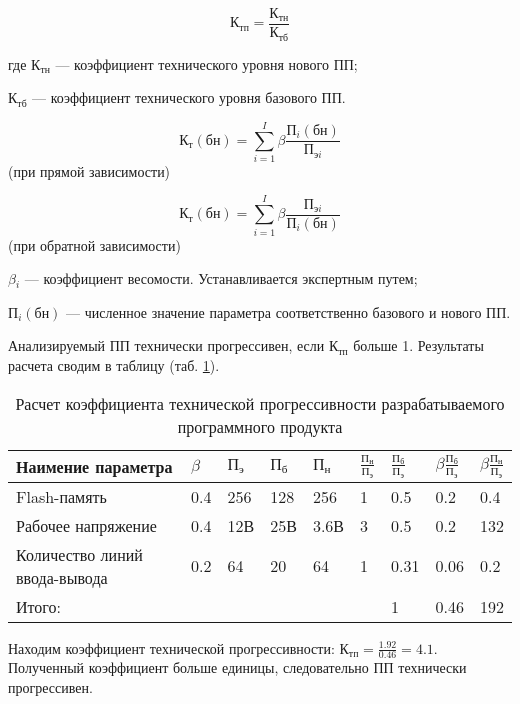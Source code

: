 \begin{equation}
К_{тп} = \frac{К_{тн}}{К_{тб}}
\end{equation}
\begin{ESKDexplanation}
	\item[где ]{} $К_{тн}$ --- коэффициент технического уровня нового ПП;
	\item{} $К_{тб}$ --- коэффициент технического уровня базового ПП.
\end{ESKDexplanation}

\begin{equation}
	К_{т}{(бн)} = \sum_{i=1}^{I}\beta{}\frac{П_i{(бн)}}{{П}_{эi}}
\end{equation}
(при прямой зависимости)

\begin{equation}
	К_{т}{(бн)} = \sum_{i=1}^{I}\beta{}\frac{П_{э i}}{П_{i}{(бн)}}
\end{equation}
(при обратной зависимости)
\begin{ESKDexplanation}
	\item{} $\beta{}_i$ --- коэффициент весомости. Устанавливается экспертным путем;
	\item{} $П_i{(бн)}$ --- численное значение параметра соответственно базового и нового ПП.
\end{ESKDexplanation}


Анализируемый ПП технически прогрессивен, если $\textrm{К}_\textrm{тп}$ больше 1. Результаты
расчета сводим в таблицу (таб. \ref{table:calcKoefTechProgress}).
\begin{table}
\caption{Расчет коэффициента технической прогрессивности разрабатываемого программного продукта}
\begin{tabular}{|p{5cm}|p{1cm}|p{1cm}|p{1cm}|p{1cm}|p{1cm}|p{1cm}|p{1cm}|p{1cm}|}
\hline{}
Наимение параметра &
	$\beta $ &
	$П_{э}$ &
	$П_{б}$ &
	$П_{н}$ &
	$\frac{П_{н}}{П_{э}}$ &
	$\frac{П_{б}}{П_{э}}$ &
	$\beta \frac{П_{б}}{П_{э}}$ &
	$\beta \frac{П_{н}}{П_{э}}$ \\
\hline{}
Flash-память & 0.4 & 256 & 128 & 256 & 1 & 0.5 & 0.2 & 0.4 \\
\hline{}
Рабочее напряжение & 0.4 & 12В & 25В & 3.6В & 3& 0.5 & 0.2 & 132 \\
\hline{}
Количество линий ввода-вывода & 0.2 & 64 & 20 & 64 & 1 & 0.31 & 0.06 & 0.2 \\
\hline{}
Итого: & & & & & & 1 & 0.46 & 192 \\
\hline
\end{tabular}
\label{table:calcKoefTechProgress}
\end{table}               
Находим коэффициент технической прогрессивности: $К_{тп} = \frac{1.92}{0.46} = 4.1$.
Полученный коэффициент больше единицы, следовательно ПП технически прогрессивен.



